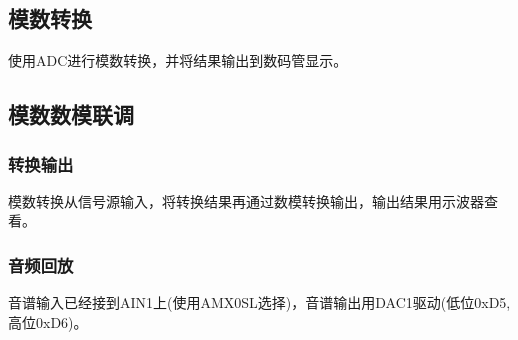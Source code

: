 \documentclass{article}
\begin{document}
\begin{CJK}{UTF8}{gkai}
\subsection{模数转换}
使用ADC进行模数转换，并将结果输出到数码管显示。

\subsection{模数数模联调}
\subsubsection{转换输出}
模数转换从信号源输入，将转换结果再通过数模转换输出，输出结果用示波器查看。
\subsubsection{音频回放}
音谱输入已经接到AIN1上(使用AMX0SL选择)，音谱输出用DAC1驱动(低位0xD5,高位0xD6)。

\end{CJK}
\end{document}
